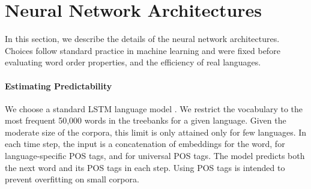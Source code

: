 \documentclass[10pt,twoside,lineno]{article}
\begin{document}







\section{Neural Network Architectures}\label{sec:neural-architectures}

In this section, we describe the details of the neural network architectures.
Choices follow standard practice in machine learning and were fixed before evaluating word order properties, and the efficiency of real languages.


\paragraph{Estimating Predictability}
We choose a standard LSTM language model \citep{goldberg2017neural, hochreiter1997long}.
We restrict the vocabulary to the most frequent 50,000 words in the treebanks for a given language.
Given the moderate size of the corpora, this limit is only attained only for few languages.
In each time step, the input is a concatenation of embeddings for the word, for language-specific POS tags, and for universal POS tags.
The model predicts both the next word and its POS tags in each step.
Using POS tags is intended to prevent overfitting on small corpora.
\end{document}
